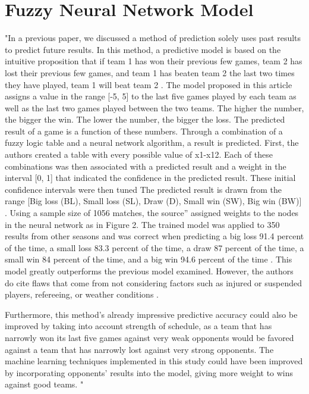 \documentclass{article}
\begin{document}
\section{Fuzzy Neural Network Model}
"In a previous paper, we discussed a method of prediction solely uses past results to predict future results. In this method, a predictive model is based on the intuitive proposition that if team 1 has won their previous few games, team 2 has lost their previous few games, and team 1 has beaten team 2 the last two times they have played, team 1 will beat team 2 \cite{FuzzyModel}. The model proposed in this article assigns a value in the range [-5, 5] to the last five games played by each team as well as the last two games played between the two teams. The higher the number, the bigger the win. The lower the number, the bigger the loss. The predicted result of a game is a function of these numbers. Through a combination of a fuzzy logic table and a neural network algorithm, a result is predicted. First, the authors created a table with every possible value of x1-x12. Each of these combinations was then associated with a predicted result and a weight in the interval [0, 1] that indicated the confidence in the predicted result. These initial confidence intervals were then tuned  The predicted result is drawn from the range [Big loss (BL), Small loss (SL), Draw (D), Small win (SW), Big win (BW)] \cite{FuzzyModel}. Using a sample size of 1056 matches, the source'' assigned weights to the nodes in the neural network as in Figure 2. The trained model was applied to 350 results from other seasons and was correct when predicting a big loss 91.4 percent of the time, a small loss 83.3 percent of the time, a draw 87 percent of the time, a small win 84 percent of the time, and a big win 94.6 percent of the time \cite{FuzzyModel}. This model greatly outperforms the previous model examined. However, the authors do cite flaws that come from not considering factors such as injured or suspended players, refereeing, or weather conditions \cite{FuzzyModel}.

Furthermore, this method's already impressive predictive accuracy could also be improved by taking into account strength of schedule, as a team that has narrowly won its last five games against very weak opponents would be favored against a team that has narrowly lost against very strong opponents. The machine learning techniques implemented in this study could have been improved by incorporating opponents' results into the model, giving more weight to wins against good teams. "
\cite{paper2}
\end{document}
